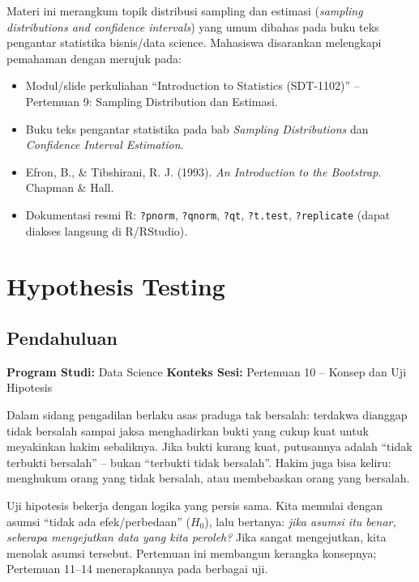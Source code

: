 \documentclass[
  indonesian,
  letterpaper,
]{book}
\providecommand{\tightlist}{%
  \setlength{\itemsep}{0pt}\setlength{\parskip}{0pt}}
\begin{document}
Materi ini merangkum topik distribusi sampling dan estimasi
(\emph{sampling distributions and confidence intervals}) yang umum
dibahas pada buku teks pengantar statistika bisnis/data science.
Mahasiswa disarankan melengkapi pemahaman dengan merujuk pada:

\begin{itemize}
\tightlist
\item
  Modul/slide perkuliahan ``Introduction to Statistics (SDT-1102)'' --
  Pertemuan 9: Sampling Distribution dan Estimasi.
\item
  Buku teks pengantar statistika pada bab \emph{Sampling Distributions}
  dan \emph{Confidence Interval Estimation}.
\item
  Efron, B., \& Tibshirani, R. J. (1993). \emph{An Introduction to the
  Bootstrap}. Chapman \& Hall.
\item
  Dokumentasi resmi R: \texttt{?pnorm}, \texttt{?qnorm}, \texttt{?qt},
  \texttt{?t.test}, \texttt{?replicate} (dapat diakses langsung di
  R/RStudio).
\end{itemize}


\chapter{Hypothesis Testing}\label{hypothesis-testing}

\section{Pendahuluan}\label{pendahuluan-1}

\textbf{Program Studi:} Data Science \textbf{Konteks Sesi:} Pertemuan 10
-- Konsep dan Uji Hipotesis

Dalam sidang pengadilan berlaku asas praduga tak bersalah: terdakwa
dianggap tidak bersalah sampai jaksa menghadirkan bukti yang cukup kuat
untuk meyakinkan hakim sebaliknya. Jika bukti kurang kuat, putusannya
adalah ``tidak terbukti bersalah'' -- bukan ``terbukti tidak bersalah''.
Hakim juga bisa keliru: menghukum orang yang tidak bersalah, atau
membebaskan orang yang bersalah.

Uji hipotesis bekerja dengan logika yang persis sama. Kita memulai
dengan asumsi ``tidak ada efek/perbedaan'' (\(H_0\)), lalu bertanya:
\emph{jika asumsi itu benar, seberapa mengejutkan data yang kita
peroleh?} Jika sangat mengejutkan, kita menolak asumsi tersebut.
Pertemuan ini membangun kerangka konsepnya; Pertemuan 11--14
menerapkannya pada berbagai uji.
\end{document}
